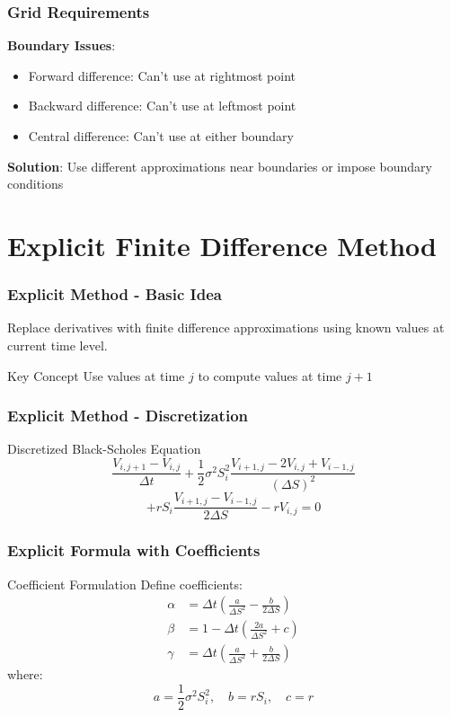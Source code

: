 \documentclass[aspectratio=169]{beamer}
\begin{document}
\begin{frame}
\frametitle{Grid Requirements}
\textbf{Boundary Issues}:
\begin{itemize}
\item Forward difference: Can't use at rightmost point
\item Backward difference: Can't use at leftmost point  
\item Central difference: Can't use at either boundary
\end{itemize}

\textbf{Solution}: Use different approximations near boundaries or impose boundary conditions
\end{frame}

\section{Explicit Finite Difference Method}

\begin{frame}
\frametitle{Explicit Method - Basic Idea}
Replace derivatives with finite difference approximations using known values at current time level.

\begin{block}{Key Concept}
Use values at time $j$ to compute values at time $j+1$
\end{block}
\end{frame}

\begin{frame}
\frametitle{Explicit Method - Discretization}
\begin{block}{Discretized Black-Scholes Equation}
\[\frac{V_{i,j+1} - V_{i,j}}{\Delta t} + \frac{1}{2}\sigma^2 S_i^2 \frac{V_{i+1,j} - 2V_{i,j} + V_{i-1,j}}{(\Delta S)^2}\]
\[+ rS_i \frac{V_{i+1,j} - V_{i-1,j}}{2\Delta S} - rV_{i,j} = 0\]
\end{block}
\end{frame}

\begin{frame}
\frametitle{Explicit Formula with Coefficients}
\begin{block}{Coefficient Formulation}
Define coefficients:
\begin{align*}
\alpha &= \Delta t \left(\frac{a}{\Delta S^2} - \frac{b}{2\Delta S}\right) \\
\beta &= 1 - \Delta t \left(\frac{2a}{\Delta S^2} + c\right) \\
\gamma &= \Delta t \left(\frac{a}{\Delta S^2} + \frac{b}{2\Delta S}\right)
\end{align*}
where:
\[a = \frac{1}{2}\sigma^2 S_i^2, \quad b = rS_i, \quad c = r\]
\end{block}
\end{frame}
\end{document}

